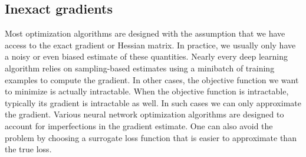 \subsection{Inexact gradients}
Most optimization algorithms are designed with the assumption that we have
access to the exact gradient or Hessian matrix. In practice, we usually only have a noisy or even biased estimate of these quantities. Nearly every deep learning algorithm relies on sampling-based estimates using a minibatch of training examples to compute the gradient.\newline\newline
In other cases, the objective function we want to minimize is actually intractable. When the objective function is intractable, typically its gradient is intractable as well. In such cases we can only approximate the gradient.\newline\newline
Various neural network optimization algorithms are designed to account for
imperfections in the gradient estimate. One can also avoid the problem by choosing a surrogate loss function that is easier to approximate than the true loss.

